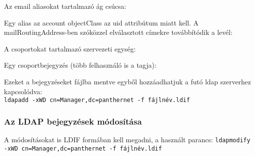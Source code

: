 \newpage
Az email aliasokat tartalmazó ág csúcsa:


Egy alias az account objectClass az uid attribútum miatt kell. A mailRoutingAddress-ben szóközzel elválasztott címekre
továbbítódik a levél:


A csoportokat tartalmazó szervezeti egység:


Egy csoportbejegyzés (több felhasználó is a tagja):



Ezeket a bejegyzéseket fájlba mentve egyből hozzáadhatjuk a futó ldap szerverhez kapcsolódva:\\
\texttt{ldapadd -xWD cn=Manager,dc=panthernet -f fájlnév.ldif}



\subsubsection{Az LDAP bejegyzések módosítása}

A módosításokat is LDIF formában kell megadni, a használt parancs:
\texttt{ldapmodify -xWD cn=Manager,dc=panthernet -f fájlnév.ldif}

